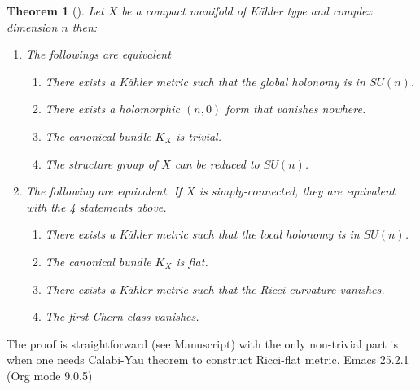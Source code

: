 \documentclass[11pt]{article}
\newtheorem{theorem}{Theorem}
\begin{document}
\begin{theorem}[]
Let \(X\) be a compact manifold of Kähler type and complex dimension \(n\) then:
\begin{enumerate}
\item The followings are equivalent
\begin{enumerate}
\item There exists a Kähler metric such that the global holonomy is in \(SU(n)\).
\item There exists a holomorphic \((n,0)\) form that vanishes nowhere.
\item The canonical bundle \(K_X\) is trivial.
\item The structure group of \(X\) can be reduced to \(SU(n)\).
\end{enumerate}
\item The following are equivalent. If \(X\) is simply-connected, they are equivalent with the 4
statements above.
\begin{enumerate}
\item There exists a Kähler metric such that the local holonomy is in \(SU(n)\).
\item The canonical bundle \(K_X\) is flat.
\item There exists a Kähler metric such that the Ricci curvature vanishes.
\item The first Chern class vanishes.
\end{enumerate}
\end{enumerate}
\end{theorem}

The proof is straightforward (see Manuscript) with the only non-trivial part is when one needs Calabi-Yau theorem to
construct Ricci-flat metric.
Emacs 25.2.1 (Org mode 9.0.5)
\end{document}
